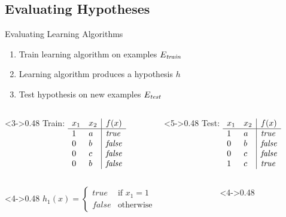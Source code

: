 \documentclass[14pt]{beamer}
\begin{document}
\subsection{Evaluating Hypotheses}

\begin{frame}[label=evaluating-ml]{Evaluating Learning Algorithms}
\begin{enumerate}
\item Train learning algorithm on examples $E_{\textit{\scriptsize train}}$
\item Learning algorithm produces a hypothesis $h$
\item Test hypothesis on new examples $E_{\textit{\scriptsize test}}$ 
\end{enumerate}
\begin{columns}
\begin{column}<3->{0.48\textwidth}
Train:
$
\begin{array}[t]{ll|l}
x_1 & x_2 & f(x) \\
\hline
1   & a   & \textit{true} \\
0   & b   & \textit{false} \\
0   & c   & \textit{false} \\
0   & b   & \textit{false} \\
\end{array}
$
\end{column}
\begin{column}<5->{0.48\textwidth}
Test:
$
\begin{array}[t]{ll|l}
x_1 & x_2 & f(x) \\
\hline
1   & a   & \textit{true} \\
0   & b   & \textit{false} \\
0   & c   & \textit{false} \\
1   & c   & \textit{true} \\
\end{array}
$
\end{column}
\end{columns}
\medskip
\begin{columns}
\begin{column}<4->{0.48\textwidth}
$\displaystyle h_1(x) = 
\begin{cases}
\textit{true} & \text{if } x_1 = 1 \\
\textit{false} & \text{otherwise}
\end{cases} $ \\
\end{column}
\begin{column}<4->{0.48\textwidth}

\end{column}
\end{columns}
\end{frame}
\end{document}
